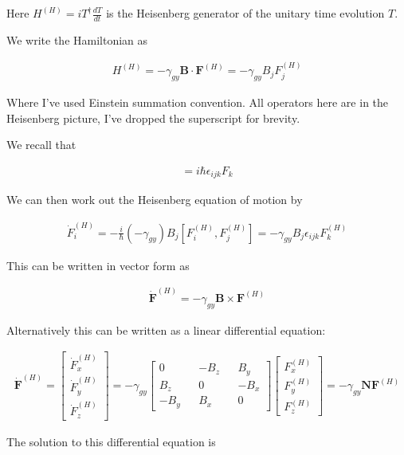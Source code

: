 \documentclass[12pt]{article}
\newcommand{\ep}{\epsilon}
\newcommand{\bv}[1]{\boldsymbol{#1}}
\begin{document}
Here $H^{(H)} = iT^{\dag}\frac{dT}{dt}$ is the Heisenberg generator of the unitary time evolution $T$.

We write the Hamiltonian as

\begin{align}
H^{(H)} = -\gamma_{gy} \bv{B}\cdot \bv{F}^{(H)} = -\gamma_{gy} B_j F_j^{(H)}
\end{align}

Where I've used Einstein summation convention.
All operators here are in the Heisenberg picture, I've dropped the superscript for brevity.


We recall that

\begin{align}
[F_i, F_j] = i \hbar \ep_{ijk} F_k
\end{align}

We can then work out the Heisenberg equation of motion by

\begin{align}
\dot{F}_i^{(H)} = -\frac{i}{\hbar} \left(-\gamma_{gy}\right) B_j [F_i^{(H)}, F_j^{(H)}] = -\gamma_{gy} B_j \ep_{ijk} F_k^{(H)}
\end{align}

This can be written in vector form as

\begin{align}
\dot{\bv{F}}^{(H)} = -\gamma_{gy} \bv{B}\times \bv{F}^{(H)}
\end{align}

Alternatively this can be written as a linear differential equation:

\begin{align}
\dot{\bv{F}}^{(H)} = 
\begin{bmatrix}
\dot{F}_x^{(H)} \\ \dot{F}_y^{(H)} \\ \dot{F}_z^{(H)}
\end{bmatrix}
= 
-\gamma_{gy}
\begin{bmatrix}
0 && -B_z && B_y\\
B_z && 0 && -B_x\\
-B_y && B_x && 0
\end{bmatrix}
\begin{bmatrix}
F_x^{(H)} \\ F_y^{(H)} \\ F_z^{(H)}
\end{bmatrix}
= -\gamma_{gy} \bv{N} \bv{F}^{(H)}
\end{align}

The solution to this differential equation is 
\end{document}
